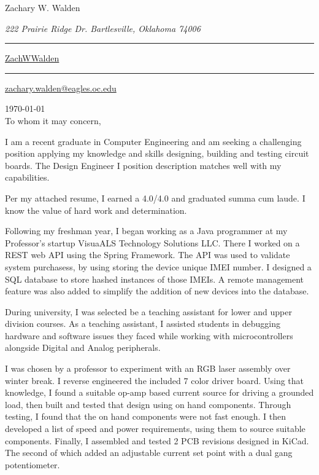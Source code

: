 \documentclass{article}
\newcommand\mybar{\kern1pt\rule[-\dp\strutbox]{.8pt}{\baselineskip}\kern1pt}
\begin{document}
\begin{center}
	\begin{Huge}
		Zachary W. Walden\\
	\end{Huge}
	\begin{large}
		\textsl{222 Prairie Ridge Dr. Bartlesville, Oklahoma 74006}\\
	\end{large}
	\begin{normalsize}
		 \mybar { } \faGithub \href{https://github.com/ZachWWalden}{ ZachWWalden}
		\mybar { }\faEnvelope\href{mailto::zachary.walden@eagles.oc.edu}{ zachary.walden@eagles.oc.edu}
	\end{normalsize}
\end{center}

\begin{adjustwidth}{70pt}{70pt}
\begin{spacing}{1.25}
\vspace*{\fill}

\today
\\
To whom it may concern,

I am a recent graduate in Computer Engineering and am seeking a challenging position applying my knowledge
and  skills designing, building and testing circuit boards. The Design Engineer I position description
matches well with my capabilities.

Per my attached resume, I earned a 4.0/4.0 and graduated summa cum laude. I know the value of hard
work and determination.

Following my freshman year, I began working as a Java programmer at my Professor's startup VisuaALS Technology Solutions LLC. There I worked on a REST web API using the Spring Framework. The API was used to validate system purchasess, by using storing the device unique IMEI number. I designed a SQL database to store hashed instances of those IMEIs. A remote management feature was also added to simplify the addition of new devices into the database.

During university, I was selected be a teaching assistant for lower and upper division courses.
As a teaching assistant, I assisted students in debugging hardware and software issues they faced while working with microcontrollers alongside Digital and Analog peripherals.

I was chosen by a professor to experiment with an RGB laser assembly over winter break. I reverse engineered the included 7 color driver board. Using that knowledge, I found a suitable op-amp based current source for driving a grounded load, then built and tested that design using on hand components. Through testing, I found that the on hand components were not fast enough. I then developed a list of speed and power requirements, using them to source suitable components. Finally, I assembled and tested 2 PCB revisions designed in KiCad. The second of which added an adjustable current set point with a dual gang potentiometer.


\end{spacing}
\end{adjustwidth}
\end{document}
